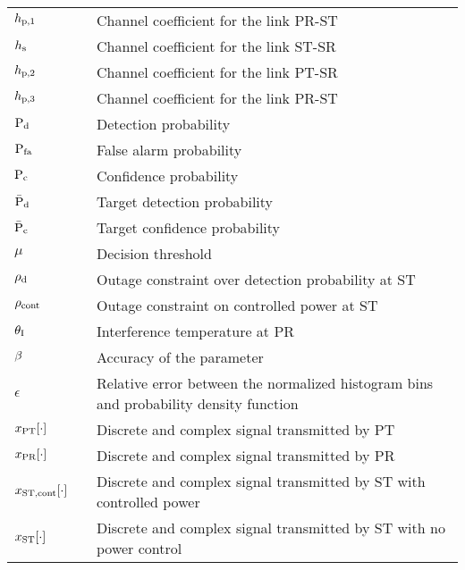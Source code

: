 \begin{longtable}{p{}p{}p{}}
       $h_{\text{p,1}}$                  & &             Channel coefficient for the link PR-ST \\
       $h_{\text{s}}$                   & &     Channel coefficient for the link ST-SR \\
       $h_{\text{p,2}}$                  & &     Channel coefficient for the link PT-SR \\
       $h_{\text{p,3}}$                 & &             Channel coefficient for the link PR-ST \\

       $\text{P}_{\text{d}}$                   & &             Detection probability \\ 
       $\text{P}_{\text{fa}}$                  & &             False alarm probability \\ 
       $\text{P}_{\text{c}}$                  & &             Confidence probability \\ 
       $\bar{\text{P}}_{\text{d}}$                  & &             Target detection probability \\ 
       $\bar{\text{P}}_{\text{c}}$                 & &             Target confidence probability \\ 
       $\mu$                   & &             Decision threshold \\ 
       $\rho_{\text{d}}$                  & &             Outage constraint over detection probability at ST \\ 
       $\rho_{\text{cont}}$                  & &             Outage constraint on controlled power at ST \\ 
       $\theta_{\text{I}}$                  & &             Interference temperature at PR \\ 
       $\beta$	               & &             Accuracy of the parameter \\	
       $\epsilon$	       & &             Relative error between the normalized histogram bins and probability density function  \\	

	$x_{\text{PT}}[\cdot]$       & &             Discrete and complex signal transmitted by PT \\	
	$x_{\text{PR}}[\cdot]$       & &             Discrete and complex signal transmitted by PR \\	
	$x_{\text{ST,cont}}[\cdot]$       & &             Discrete and complex signal transmitted by ST with controlled power \\	
	$x_{\text{ST}}[\cdot]$       & &             Discrete and complex signal transmitted by ST with no power control\\	


\end{longtable}
